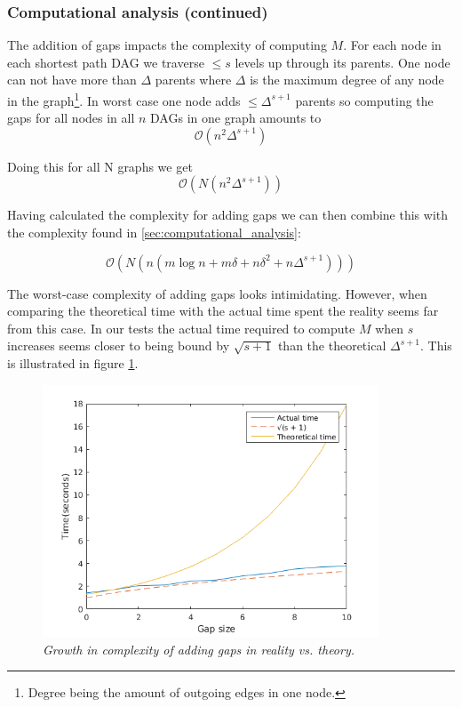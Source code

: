 \documentclass{article}
\begin{document}
\subsubsection{Computational analysis (continued)}
The addition of gaps impacts the complexity of computing $M$. For each node in each shortest path DAG we traverse $\leq s$ levels up through its parents. One node can not have more than $\Delta$ parents where $\Delta$ is the maximum degree of any node in the graph\footnote{Degree being the amount of outgoing edges in one node.}. In worst case one node adds $\leq\Delta^{s+1}$ parents so computing the gaps for all nodes in all $n$ DAGs in one graph amounts to
\begin{equation}
\mathcal{O}\left(n^2\Delta^{s+1}\right)
\end{equation}

Doing this for all N graphs we get
\begin{equation}
\mathcal{O}\left(N(n^2\Delta^{s + 1})\right)
\end{equation}

Having calculated the complexity for adding gaps we can then combine this with the complexity found in \ref{sec:computational_analysis}:

\begin{equation}
\mathcal{O}\left(N\left(n\left(m\log n + m\delta + n\delta^2 + n\Delta^{s + 1}\right)\right)\right)
\end{equation}

The worst-case complexity of adding gaps looks intimidating. However, when comparing the theoretical time with the actual time spent the reality seems far from this case. In our tests the actual time required to compute $M$ when $s$ increases seems closer to being bound by $\sqrt{s+1}$ than the theoretical $\Delta^{s+1}$. This is illustrated in figure \ref{fig:time_complexity_gaps}.

\begin{figure}[H]
	\centering
	\includegraphics[width=10cm]{time_complexity_gaps}
	\caption{\textit{Growth in complexity of adding gaps in reality vs. theory.}}
	\label{fig:time_complexity_gaps}
\end{figure}
\end{document}
